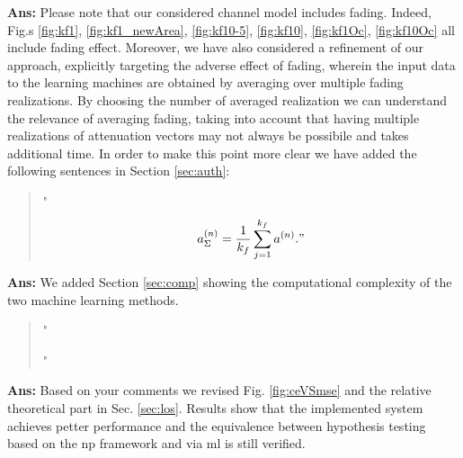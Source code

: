 \documentclass[draftcls,onecolumn,12pt]{IEEEtran}
\newcounter{revc}
\newcommand{\revp}[1]{\zref[revcontent]{#1}}
\begin{document}
{
{\bf Ans:} Please note that our considered channel model includes fading. Indeed, Fig.s \ref{fig:kf1}, \ref{fig:kf1_newArea}, \ref{fig:kf10-5}, \ref{fig:kf10}, \ref{fig:kf1Oc}, \ref{fig:kf10Oc} all include fading effect. Moreover, we have also considered a refinement of our approach, explicitly targeting the adverse effect of fading, wherein the input data to the learning machines are obtained by averaging over multiple fading realizations. By choosing the number of averaged realization we can understand the relevance of averaging fading, taking into account that having multiple realizations of attenuation vectors may not always be possibile and takes additional time. In order to make this point more clear we have added the following sentences in Section \ref{sec:auth}:
\begin{quote}
    "\revp{avg_1}
$$
a^{(n)}_{\Sigma} = \frac{1}{k_f}\sum_{j=1}^{k_f} a^{(n)}."
$$
\end{quote}


\vspace{5mm} %
\begin{framed}
\end{framed}

{\bf Ans:} We added Section \ref{sec:comp} showing the computational complexity of the two machine learning methods.

\begin{quote}
"\revp{comp1} 

\revp{comp2}

\revp{comp3}"
\end{quote}

\vspace{5mm} %
\begin{framed}
\end{framed}

{\bf Ans:} Based on your comments we revised Fig. \ref{fig:ceVSmse} and the relative theoretical part in Sec. \ref{sec:los}. Results show that the implemented system achieves petter performance and the equivalence between hypothesis testing based on the \ac{np} framework and via \ac{ml} is still verified.

}
\end{document}
